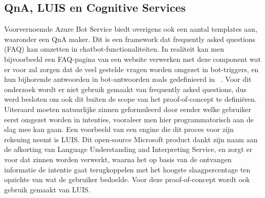 \subsection{QnA, LUIS en Cognitive Services}
Voorvernoemde Azure Bot Service biedt overigens ook een aantal templates aan, waaronder een QnA maker. Dit is een framework dat frequently asked questions (FAQ) kan omzetten in chatbot-functionaliteiten. In realiteit kan men bijvoorbeeld een FAQ-pagina van een website verwerken met deze component wat er voor zal zorgen dat de veel gestelde vragen worden omgezet in bot-triggers, en hun bijhorende antwoorden in bot-antwoorden zoals gedefinieerd in ~\cite{Azure2019}. Voor dit onderzoek wordt er niet gebruik gemaakt van frequently asked questions, dus werd besloten om ook dit buiten de scope van het proof-of-concept te definiëren. 
Uiteraard moeten natuurlijke zinnen geformuleerd door eender welke gebruiker eerst omgezet worden in intenties, vooraleer men hier programmatorisch aan de slag mee kan gaan. Een voorbeeld van een engine die dit proces voor zijn rekening neemt is LUIS. Dit open-source Microsoft product dankt zijn naam aan de afkorting van Language Understanding and Interpreting Service, en zorgt er voor dat zinnen worden verwerkt, waarna het op basis van de ontvangen informatie de intentie gaat terugkoppelen met het hoogste slaagpercentage ten opzichte van wat de gebruiker bedoelde. Voor deze proof-of-concept wordt ook gebruik gemaakt van LUIS.
